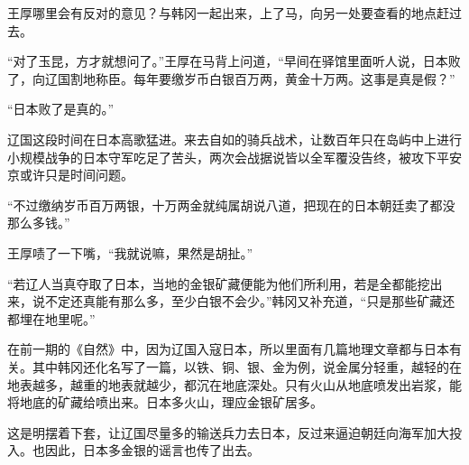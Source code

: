王厚哪里会有反对的意见？与韩冈一起出来，上了马，向另一处要查看的地点赶过去。

“对了玉昆，方才就想问了。”王厚在马背上问道，“早间在驿馆里面听人说，日本败了，向辽国割地称臣。每年要缴岁币白银百万两，黄金十万两。这事是真是假？”

“日本败了是真的。”

辽国这段时间在日本高歌猛进。来去自如的骑兵战术，让数百年只在岛屿中上进行小规模战争的日本守军吃足了苦头，两次会战据说皆以全军覆没告终，被攻下平安京或许只是时间问题。

“不过缴纳岁币百万两银，十万两金就纯属胡说八道，把现在的日本朝廷卖了都没那么多钱。”

王厚啧了一下嘴，“我就说嘛，果然是胡扯。”

“若辽人当真夺取了日本，当地的金银矿藏便能为他们所利用，若是全都能挖出来，说不定还真能有那么多，至少白银不会少。”韩冈又补充道，“只是那些矿藏还都埋在地里呢。”

在前一期的《自然》中，因为辽国入寇日本，所以里面有几篇地理文章都与日本有关。其中韩冈还化名写了一篇，以铁、铜、银、金为例，说金属分轻重，越轻的在地表越多，越重的地表就越少，都沉在地底深处。只有火山从地底喷发出岩浆，能将地底的矿藏给喷出来。日本多火山，理应金银矿居多。

这是明摆着下套，让辽国尽量多的输送兵力去日本，反过来逼迫朝廷向海军加大投入。也因此，日本多金银的谣言也传了出去。

